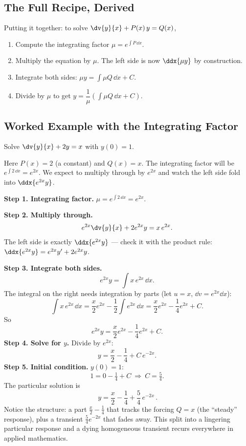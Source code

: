 \subsection{The Full Recipe, Derived}

Putting it together: to solve $\dv{y}{x} + P(x)\,y = Q(x)$,
\begin{enumerate}
\item Compute the integrating factor $\mu = e^{\int P\,\dd x}$.
\item Multiply the equation by $\mu$. The left side is now $\ddx{\mu y}$ by
construction.
\item Integrate both sides: $\mu y = \int \mu Q\,\dd x + C$.
\item Divide by $\mu$ to get $y = \dfrac{1}{\mu}\left(\int \mu Q\,\dd x + C\right)$.
\end{enumerate}

\subsection{Worked Example with the Integrating Factor}

Solve $\dv{y}{x} + 2y = x$ with $y(0)=1$.

\begin{walkbox}
Here $P(x)=2$ (a constant) and $Q(x)=x$. The integrating factor will be
$e^{\int 2\,\dd x}=e^{2x}$. We expect to multiply through by $e^{2x}$ and watch the
left side fold into $\ddx{e^{2x}y}$.
\end{walkbox}

\textbf{Step 1. Integrating factor.} $\mu = e^{\int 2\,\dd x}=e^{2x}$.

\textbf{Step 2. Multiply through.}
\[
  e^{2x}\dv{y}{x} + 2e^{2x}y = x\,e^{2x}.
\]
The left side is exactly $\ddx{e^{2x}y}$ --- check it with the product rule:
$\ddx{e^{2x}y} = e^{2x}y' + 2e^{2x}y$.

\textbf{Step 3. Integrate both sides.}
\[
  e^{2x}y = \int x\,e^{2x}\,\dd x.
\]
The integral on the right needs integration by parts (let $u=x$, $\dd v=e^{2x}\dd
x$):
\[
  \int x\,e^{2x}\,\dd x = \frac{x}{2}e^{2x} - \frac{1}{2}\int e^{2x}\,\dd x
  = \frac{x}{2}e^{2x} - \frac{1}{4}e^{2x} + C.
\]
So
\[
  e^{2x}y = \frac{x}{2}e^{2x} - \frac{1}{4}e^{2x} + C.
\]
\textbf{Step 4. Solve for $y$.} Divide by $e^{2x}$:
\[
  y = \frac{x}{2} - \frac{1}{4} + C\,e^{-2x}.
\]
\textbf{Step 5. Initial condition.} $y(0)=1$:
\[
  1 = 0 - \tfrac14 + C \ \Rightarrow\ C = \tfrac54.
\]
The particular solution is
\[
  \boxed{\,y = \frac{x}{2} - \frac14 + \frac54\,e^{-2x}\,}.
\]
Notice the structure: a part $\frac{x}{2}-\frac14$ that tracks the forcing $Q=x$
(the ``steady'' response), plus a transient $\frac54 e^{-2x}$ that fades away. This
split into a lingering particular response and a dying homogeneous transient recurs
everywhere in applied mathematics.

